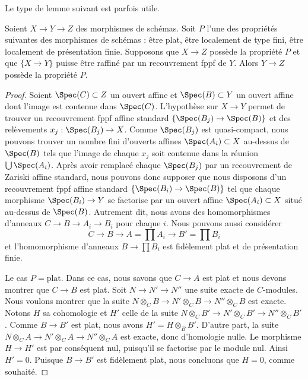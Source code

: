 \noindent
Le type de lemme suivant est parfois utile.

\begin{lemma}
\label{lemma-curiosity}
Soient $X \to Y \to Z$ des morphismes de schémas.
Soit $P$ l'une des propriétés suivantes des morphismes de schémas :
être plat, être localement de type fini, être localement de présentation
finie. Supposons que $X \to Z$ possède la propriété $P$ et que
$\{X \to Y\}$ puisse être raffiné par un recouvrement fppf de $Y$.
Alors $Y \to Z$ possède la propriété $P$.
\end{lemma}

\begin{proof}
Soient $\Spec(C) \subset Z$ un ouvert affine et
$\Spec(B) \subset Y$ un ouvert affine dont l'image est contenue dans
$\Spec(C)$. L'hypothèse sur $X \to Y$ permet de trouver un recouvrement
fppf affine standard $\{\Spec(B_j) \to \Spec(B)\}$ et des relèvements
$x_j : \Spec(B_j) \to X$. Comme $\Spec(B_j)$ est quasi-compact, nous
pouvons trouver un nombre fini d'ouverts affines
$\Spec(A_i) \subset X$ au-dessus de $\Spec(B)$ tels que l'image de
chaque $x_j$ soit contenue dans la réunion $\bigcup \Spec(A_i)$.
Après avoir remplacé chaque $\Spec(B_j)$ par un recouvrement de Zariski
affine standard, nous pouvons donc supposer que nous disposons d'un
recouvrement fppf affine standard
$\{\Spec(B_i) \to \Spec(B)\}$ tel que chaque morphisme
$\Spec(B_i) \to Y$ se factorise par un ouvert affine
$\Spec(A_i) \subset X$ situé au-dessus de $\Spec(B)$. Autrement dit,
nous avons des homomorphismes d'anneaux $C \to B \to A_i \to B_i$
pour chaque $i$. Nous pouvons aussi considérer
$$
C \to B \to A = \prod A_i \to B' = \prod B_i
$$
et l'homomorphisme d'anneaux $B \to \prod B_i$ est fidèlement plat et
de présentation finie.

\medskip\noindent
Le cas $P = \text{plat}$. Dans ce cas, nous savons que $C \to A$ est plat et
nous devons montrer que $C \to B$ est plat. Soit
$N \to N' \to N''$ une suite exacte de $C$-modules. Nous voulons
montrer que la suite
$N \otimes_C B \to N' \otimes_C B \to N'' \otimes_C B$ est exacte.
Notons $H$ sa cohomologie et $H'$ celle de la suite
$N \otimes_C B' \to N' \otimes_C B' \to N'' \otimes_C B'$.
Comme $B \to B'$ est plat, nous avons $H' = H \otimes_B B'$.
D'autre part, la suite
$N \otimes_C A \to N' \otimes_C A \to N'' \otimes_C A$ est exacte,
donc d'homologie nulle. Le morphisme $H \to H'$ est par conséquent
nul, puisqu'il se factorise par le module nul. Ainsi $H' = 0$.
Puisque $B \to B'$ est fidèlement plat, nous concluons que $H = 0$,
comme souhaité.


\end{proof}
